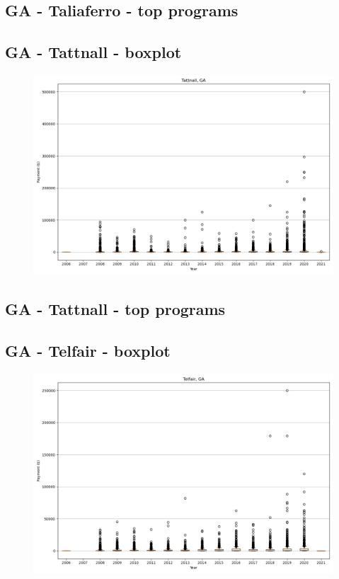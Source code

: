\subsection*{GA - Taliaferro - top programs}

\newpage
\subsection*{GA - Tattnall - boxplot}
\begin{figure}[h]
\centering
\includegraphics[width=7in]{../output/boxplots/counties/Tattnall-GA_boxplot.png}
\end{figure}


\subsection*{GA - Tattnall - top programs}

\newpage
\subsection*{GA - Telfair - boxplot}
\begin{figure}[h]
\centering
\includegraphics[width=7in]{../output/boxplots/counties/Telfair-GA_boxplot.png}
\end{figure}


